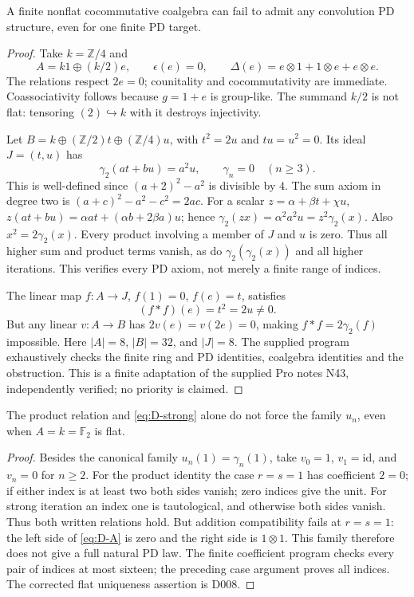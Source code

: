 \begin{proposition}
\label{sa08:D009}
A finite nonflat cocommutative coalgebra can fail to admit any
convolution PD structure, even for one finite PD target.
\end{proposition}
\begin{proof}
Take $k=\mathbb Z/4$ and
\[
 A=k1\oplus(k/2)e,\qquad
 \epsilon(e)=0,\qquad
 \Delta(e)=e\otimes1+1\otimes e+e\otimes e.
\]
The relations respect $2e=0$; counitality and cocommutativity are
immediate. Coassociativity follows because $g=1+e$ is group-like.
The summand $k/2$ is not flat: tensoring $(2)\hookrightarrow k$
with it destroys injectivity.

Let $B=k\oplus(\mathbb Z/2)t\oplus(\mathbb Z/4)u$, with
$t^2=2u$ and $tu=u^2=0$. Its ideal $J=(t,u)$ has
\[
 \gamma_2(at+bu)=a^2u,\qquad\gamma_n=0\quad(n\geq3).
\]
This is well-defined since $(a+2)^2-a^2$ is divisible by $4$.
The sum axiom in degree two is
$(a+c)^2-a^2-c^2=2ac$. For a scalar
$z=\alpha+\beta t+\chi u$,
$z(at+bu)=\alpha at+(\alpha b+2\beta a)u$; hence
$\gamma_2(zx)=\alpha^2a^2u=z^2\gamma_2(x)$.
Also $x^2=2\gamma_2(x)$. Every product involving a member of $J$
and $u$ is zero. Thus all higher sum and product terms vanish,
as do $\gamma_2(\gamma_2(x))$ and all higher iterations. This
verifies every PD axiom, not merely a finite range of indices.

The linear map $f:A\to J$, $f(1)=0$, $f(e)=t$, satisfies
\[
 (f*f)(e)=t^2=2u\ne0.
\]
But any linear $v:A\to B$ has $2v(e)=v(2e)=0$, making
$f*f=2\gamma_2(f)$ impossible. Here
$|A|=8$, $|B|=32$, and $|J|=8$. The supplied program exhaustively
checks the finite ring and PD identities, coalgebra identities and
the obstruction. This is a finite adaptation of the supplied Pro
notes N43, independently verified; no priority is claimed.
\end{proof}

\begin{proposition}
\label{sa08:D010}
The product relation and \eqref{eq:D-strong} alone do not force the
family $u_n$, even when $A=k=\mathbb F_2$ is flat.
\end{proposition}
\begin{proof}
Besides the canonical family $u_n(1)=\gamma_n(1)$, take
$v_0=1$, $v_1=\mathrm{id}$, and $v_n=0$ for $n\geq2$.
For the product identity the case $r=s=1$ has coefficient $2=0$;
if either index is at least two both sides vanish; zero indices
give the unit. For strong iteration an index one is tautological,
and otherwise both sides vanish. Thus both written relations hold.
But addition compatibility fails at $r=s=1$: the left side of
\eqref{eq:D-A} is zero and the right side is $1\otimes1$.
This family therefore does not give a full natural PD law.
The finite coefficient program checks every pair of indices at
most sixteen; the preceding case argument proves all indices.
The corrected flat uniqueness assertion is D008.
\end{proof}

